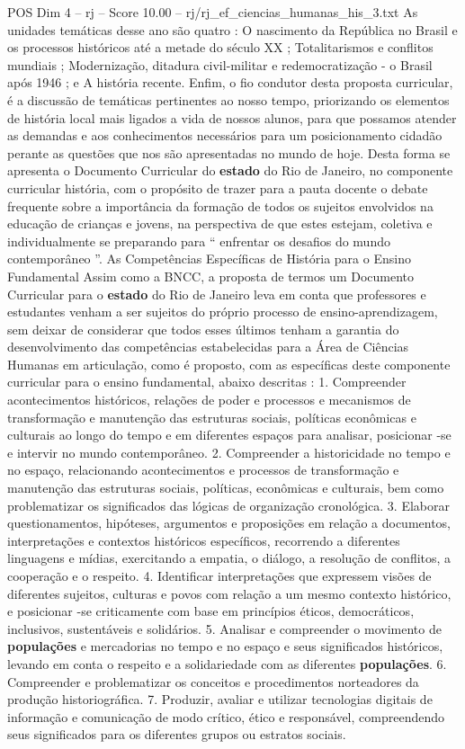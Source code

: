 \begin{textsample}{POS Dim 4 – rj – Score 10.00 – rj/rj\_ef\_ciencias\_humanas\_his\_3.txt}
As unidades temáticas desse ano são quatro : O nascimento da República no Brasil e os processos históricos até a metade do século XX ; Totalitarismos e conflitos mundiais ; Modernização, ditadura civil-militar e redemocratização - o Brasil após 1946 ; e A história recente.
Enfim, o fio condutor desta proposta curricular, é a discussão de temáticas pertinentes ao nosso tempo, priorizando os elementos de história local mais ligados a vida de nossos alunos, para que possamos atender as demandas e aos conhecimentos necessários para um posicionamento cidadão perante as questões que nos são apresentadas no mundo de hoje.
Desta forma se apresenta o Documento Curricular do \textbf{estado} do Rio de Janeiro, no componente curricular história, com o propósito de trazer para a pauta docente o debate frequente sobre a importância da formação de todos os sujeitos envolvidos na educação de crianças e jovens, na perspectiva de que estes estejam, coletiva e individualmente se preparando para “ enfrentar os desafios do mundo contemporâneo ”.
As Competências Específicas de História para o Ensino Fundamental Assim como a BNCC, a proposta de termos um Documento Curricular para o \textbf{estado} do Rio de Janeiro leva em conta que professores e estudantes venham a ser sujeitos do próprio processo de ensino-aprendizagem, sem deixar de considerar que todos esses últimos tenham a garantia do desenvolvimento das competências estabelecidas para a Área de Ciências Humanas em articulação, como é proposto, com as específicas deste componente curricular para o ensino fundamental, abaixo descritas : 1.
Compreender acontecimentos históricos, relações de poder e processos e mecanismos de transformação e manutenção das estruturas sociais, políticas econômicas e culturais ao longo do tempo e em diferentes espaços para analisar, posicionar -se e intervir no mundo contemporâneo. 2.
Compreender a historicidade no tempo e no espaço, relacionando acontecimentos e processos de transformação e manutenção das estruturas sociais, políticas, econômicas e culturais, bem como problematizar os significados das lógicas de organização cronológica. 3.
Elaborar questionamentos, hipóteses, argumentos e proposições em relação a documentos, interpretações e contextos históricos específicos, recorrendo a diferentes linguagens e mídias, exercitando a empatia, o diálogo, a resolução de conflitos, a cooperação e o respeito. 4.
Identificar interpretações que expressem visões de diferentes sujeitos, culturas e povos com relação a um mesmo contexto histórico, e posicionar -se criticamente com base em princípios éticos, democráticos, inclusivos, sustentáveis e solidários. 5.
Analisar e compreender o movimento de \textbf{populações} e mercadorias no tempo e no espaço e seus significados históricos, levando em conta o respeito e a solidariedade com as diferentes \textbf{populações}. 6.
Compreender e problematizar os conceitos e procedimentos norteadores da produção historiográfica. 7.
Produzir, avaliar e utilizar tecnologias digitais de informação e comunicação de modo crítico, ético e responsável, compreendendo seus significados para os diferentes grupos ou estratos sociais.


\end{textsample}
